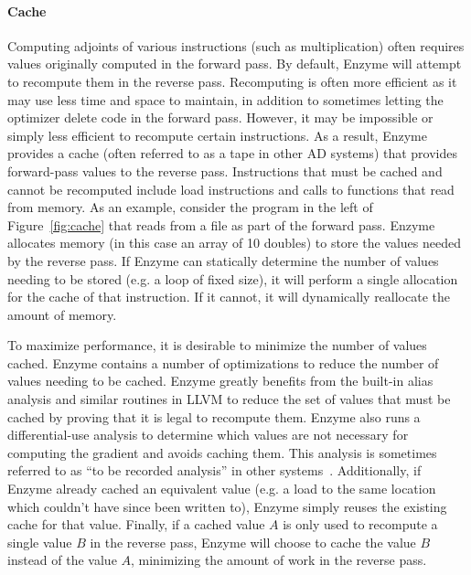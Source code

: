 \paragraph{Cache}
Computing adjoints of various instructions (such as multiplication) often requires values originally computed in the forward pass. By default, Enzyme will attempt to recompute them in the reverse pass. Recomputing is often more efficient as it may use less time and space to maintain, in addition to sometimes letting the optimizer delete code in the forward pass. However, it may be impossible or simply less efficient to recompute certain instructions. As a result, Enzyme provides a cache (often referred to as a tape in other AD systems) that provides forward-pass values to the reverse pass. Instructions that must be cached and cannot be recomputed include load instructions and calls to functions that read from memory. As an example, consider the program in the left of Figure~\ref{fig:cache} that reads from a file as part of the forward pass. Enzyme allocates memory (in this case an array of 10 doubles) to store the values needed by the reverse pass. If Enzyme can statically determine the number of values needing to be stored (e.g. a loop of fixed size), it will perform a single allocation for the cache of that instruction. If it cannot, it will dynamically reallocate the amount of memory.

To maximize performance, it is desirable to minimize the number of values cached. Enzyme contains a number of optimizations to reduce the number of values needing to be cached. Enzyme greatly benefits from the built-in alias analysis and similar routines in LLVM to reduce the set of values that must be cached by proving that it is legal to recompute them. Enzyme also runs a differential-use analysis to determine which values are not necessary for computing the gradient and avoids caching them. This analysis is sometimes referred to as ``to be recorded analysis'' in other systems~\cite{hascoet2005recorded}. Additionally, if Enzyme already cached an equivalent value (e.g. a load to the same location which couldn't have since been written to), Enzyme simply reuses the existing cache for that value. Finally, if a cached value $A$ is only used to recompute a single value $B$ in the reverse pass, Enzyme will choose to cache the value $B$ instead of the value $A$, minimizing the amount of work in the reverse pass.

